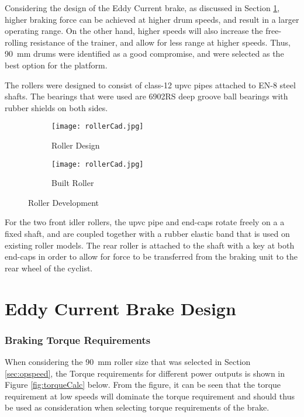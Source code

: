 Considering the design of the Eddy Current brake, as discussed in Section \ref{sec:Eddy}, higher braking force can be achieved at higher drum speeds, and result in a larger operating range. On the other hand, higher speeds will also increase the free-rolling resistance of the trainer, and allow for less range at higher speeds. Thus, \SI{90}{\milli\meter} drums were identified as a good compromise, and were selected as the best option for the platform.

The rollers were designed to consist of class-12 \acf{upvc} pipes attached to EN-8 steel shafts. The bearings that were used are 6902RS deep groove ball bearings with rubber shields on both sides.

\begin{figure}[H]
	\centering
	\begin{subfigure}{.5\textwidth}
		\centering
		\texttt{[image: rollerCad.jpg]}
		\caption{Roller Design}
		\label{fig:rollerCAD}
	\end{subfigure}%
	\begin{subfigure}{.5\textwidth}
		\centering
		\texttt{[image: rollerCad.jpg]}
		\caption{Built Roller}
		\label{fig:rollerBuild}
	\end{subfigure}
	\caption{Roller Development}
	\label{fig:rollerDev}
\end{figure}

For the two front idler rollers, the \ac{upvc} pipe and end-caps rotate freely on a a fixed shaft, and are coupled together with a rubber elastic band that is used on existing roller models. The rear roller is attached to the shaft with a key at both end-caps in order to allow for force to be transferred from the braking unit to the rear wheel of the cyclist.

\section{Eddy Current Brake Design}
\label{sec:Eddy}

\subsubsection{Braking Torque Requirements}

When considering the \SI{90}{\milli\meter} roller size that was selected in Section \ref{sec:opspeed}, the Torque requirements for different power outputs is shown in Figure \ref{fig:torqueCalc} below. From the figure, it can be seen that the torque requirement at low speeds will dominate the torque requirement and should thus be used as consideration when selecting torque requirements of the brake.

